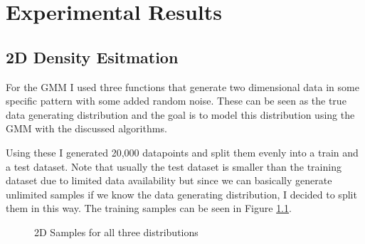 \chapter{Experimental Results}
\label{cha:experimental_results}

\section{2D Density Esitmation}

For the GMM I used three functions that generate two dimensional data in some specific pattern with some added random noise. These 
can be seen as the true data generating distribution and the goal is to model this distribution using the GMM with the discussed 
algorithms. 

Using these I generated 20,000 datapoints and split them evenly into a train and a test dataset. Note that usually the test dataset is smaller 
than the training dataset due to limited data availability but since we can basically generate unlimited samples if we know 
the data generating distribution, I decided to split them in this way. 
The training samples can be seen in Figure \ref{fig:2d_datasets}. \\

\begin{figure}[H]
    \centering
    \caption{2D Samples for all three distributions}
    \label{fig:2d_datasets}
\end{figure}

\newpage

